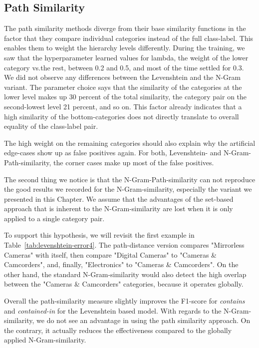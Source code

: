\subsection{Path Similarity}

The path similarity methods diverge from their base similarity functions in the factor that they compare individual
categories instead of the full class-label.
This enables them to weight the hierarchy levels differently.
During the training, we saw that the hyperparameter learned values for lambda, the weight of the lower category vs.\@ the rest,
between 0.2 and 0.5, and most of the time settled for 0.3.
We did not observe any differences between  the Levenshtein and the N-Gram variant.
The parameter choice says that the similarity of the categories at the lower level makes up 30 percent of the total similarity,
the category pair on the second-lowest level 21 percent, and so on.
This factor already indicates that a high similarity of the bottom-categories does not directly translate to overall
equality of the class-label pair.

The high  weight on the remaining categories should also explain why the artificial edge-cases show up as false positives
again.
For both, Levenshtein- and N-Gram-Path-similarity, the corner cases make up most of the false positives.

The second thing we notice is that the N-Gram-Path-similarity can not reproduce the good results we recorded for the
N-Gram-similarity, especially the variant we presented in this Chapter.
We assume that the advantages of the set-based approach that is inherent to the N-Gram-similarity are lost when it is
only applied to a single category pair.

To support this hypothesis, we will revisit the first example in Table~\ref{tab:levenshtein-error4}.
The path-distance version compares "Mirrorless Cameras" with itself, then compare "Digital Cameras" to "Cameras \&
Camcorders", and, finally, "Electronics" to "Cameras \& Camcorders".
On the  other hand, the standard N-Gram-similarity would also detect the high overlap between the "Cameras \& Camcorders"
categories, because it operates globally.

Overall the path-similarity measure slightly improves the F1-score for \emph{contains} and \emph{contained-in} for the Levenshtein
based model.
With regards to the N-Gram-similarity, we do not see an advantage in using the path similarity approach.
On the contrary, it actually reduces the effectiveness compared to the globally applied N-Gram-similarity.

